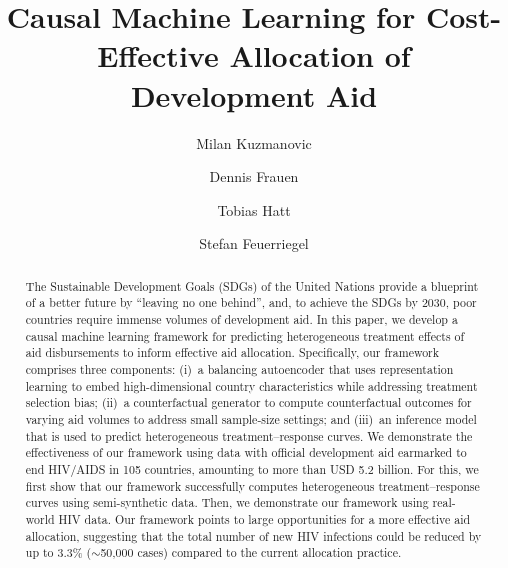 \documentclass[sigconf]{acmart}
\begin{document}
\title{Causal Machine Learning for Cost-Effective Allocation of Development Aid}

\author{Milan Kuzmanovic}

\author{Dennis Frauen}

\author{Tobias Hatt}

\author{Stefan Feuerriegel}

\renewcommand{\shortauthors}{Kuzmanovic, et al.}

\begin{abstract}
The Sustainable Development Goals (SDGs) of the United Nations provide a blueprint of a better future by ``leaving no one behind'', and, to achieve the SDGs by 2030, poor countries require immense volumes of development aid. In this paper, we develop a causal machine learning framework for predicting heterogeneous treatment effects of aid disbursements to inform effective aid allocation. Specifically, our framework comprises three components: (i)~a balancing autoencoder that uses representation learning to embed high-dimensional country characteristics while addressing treatment selection bias; (ii)~a counterfactual generator to compute counterfactual outcomes for varying aid volumes to address small sample-size settings; and (iii)~an inference model that is used to predict heterogeneous treatment--response curves. We demonstrate the effectiveness of our framework using data with official development aid earmarked to end HIV/AIDS in 105 countries, amounting to more than USD 5.2 billion. For this, we first show that our framework successfully computes heterogeneous treatment--response curves using semi-synthetic data. Then, we demonstrate our framework using real-world HIV data. Our framework points to large opportunities for a more effective aid allocation, suggesting that the total number of new HIV infections could be reduced by up to 3.3\% ($\sim$50,000 cases) compared to the current allocation practice.
\end{abstract}
\end{document}
